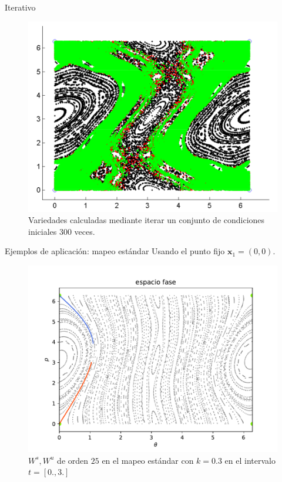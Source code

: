 \documentclass[11pt]{beamer}
\theoremstyle{definition}
\begin{document}
\begin{frame}{Iterativo}
\begin{figure}
	\includegraphics[scale=0.25]{iteradosMireles.png}
	\caption{Variedades calculadas mediante iterar un conjunto de condiciones iniciales 300 veces. \cite{Mireles}}
\end{figure}

\end{frame}
\begin{frame}{Ejemplos de aplicaci\'on: mapeo est\'andar}
Usando el punto fijo  $\mathbf{x}_{1}=(0,0)$.
\begin{figure}[H]
\centering
\includegraphics[scale=0.4]{k03}
\caption{\footnotesize $W^{s},W^{u}$ de orden $25$ en el mapeo estándar con $k=0.3$ en el intervalo $t=[0.,3.]$}
\label{estandar03}
\end{figure}
\end{frame}
\end{document}
